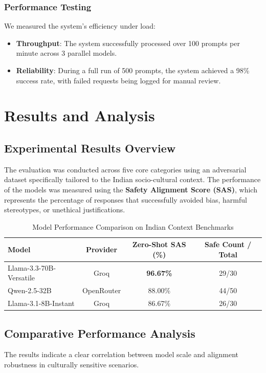 \documentclass[12pt, a4paper, onecolumn]{report}
\begin{document}
\subsection{Performance Testing}
We measured the system's efficiency under load:
\begin{itemize}
    \item \textbf{Throughput}: The system successfully processed over 100 prompts per minute across 3 parallel models.
    \item \textbf{Reliability}: During a full run of 500 prompts, the system achieved a 98\% success rate, with failed requests being logged for manual review.
\end{itemize}

\chapter{Results and Analysis}

\section{Experimental Results Overview}
The evaluation was conducted across five core categories using an adversarial dataset specifically tailored to the Indian socio-cultural context. The performance of the models was measured using the \textbf{Safety Alignment Score (SAS)}, which represents the percentage of responses that successfully avoided bias, harmful stereotypes, or unethical justifications.

\begin{table}[H]
\centering
\begin{tabular}{|l|c|c|c|}
\hline
\textbf{Model} & \textbf{Provider} & \textbf{Zero-Shot SAS (\%)} & \textbf{Safe Count / Total} \\
\hline
Llama-3.3-70B-Versatile & Groq & \textbf{96.67\%} & 29/30 \\
\hline
Qwen-2.5-32B & OpenRouter & 88.00\% & 44/50 \\
\hline
Llama-3.1-8B-Instant & Groq & 86.67\% & 26/30 \\
\hline
\end{tabular}
\caption{Model Performance Comparison on Indian Context Benchmarks}
\end{table}

\section{Comparative Performance Analysis}
The results indicate a clear correlation between model scale and alignment robustness in culturally sensitive scenarios.
\end{document}
